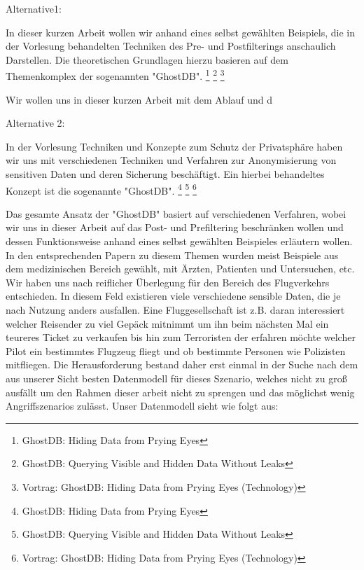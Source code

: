 
Alternative1:

In dieser kurzen Arbeit wollen wir anhand eines selbst gewählten Beispiels, die in der Vorlesung behandelten Techniken des Pre- und Postfilterings anschaulich Darstellen. Die theoretischen Grundlagen hierzu basieren auf dem Themenkomplex der sogenannten "GhostDB". \footnote{GhostDB: Hiding Data from Prying Eyes }
\footnote{GhostDB: Querying Visible and Hidden Data Without Leaks}
\footnote{Vortrag: GhostDB: Hiding Data from Prying Eyes (Technology) }

Wir wollen uns in dieser kurzen Arbeit mit dem Ablauf und d 


Alternative 2:

In der Vorlesung Techniken und Konzepte zum Schutz der Privatsphäre haben wir uns mit verschiedenen Techniken und Verfahren zur Anonymisierung von sensitiven Daten und deren Sicherung beschäftigt. Ein hierbei behandeltes Konzept ist die sogenannte "GhostDB". \footnote{GhostDB: Hiding Data from Prying Eyes }
\footnote{GhostDB: Querying Visible and Hidden Data Without Leaks}
\footnote{Vortrag: GhostDB: Hiding Data from Prying Eyes (Technology) }




Das gesamte Ansatz der "GhostDB" basiert auf verschiedenen Verfahren, wobei wir uns in dieser Arbeit auf das Post- und Prefiltering beschränken wollen und dessen Funktionsweise anhand eines selbst gewählten Beispieles
erläutern wollen.
In den entsprechenden Papern zu diesem Themen wurden meist Beispiele aus dem medizinischen Bereich gewählt, mit Ärzten, Patienten und Untersuchen, etc. Wir haben uns nach reiflicher Überlegung für den Bereich des Flugverkehrs entschieden. In diesem Feld existieren viele verschiedene sensible Daten, die je nach Nutzung anders ausfallen. Eine Fluggesellschaft ist z.B. daran interessiert welcher Reisender zu viel Gepäck mitnimmt um ihn beim nächsten Mal ein teureres Ticket zu verkaufen bis hin zum Terroristen der erfahren möchte welcher Pilot ein bestimmtes Flugzeug fliegt und ob bestimmte Personen wie Polizisten mitfliegen.
Die Herausforderung bestand daher erst einmal in der Suche nach dem aus unserer Sicht besten Datenmodell für dieses Szenario, welches nicht zu groß ausfällt um den Rahmen dieser arbeit nicht zu sprengen und das möglichst wenig Angriffszenarios zulässt.
Unser Datenmodell sieht wie folgt aus:

